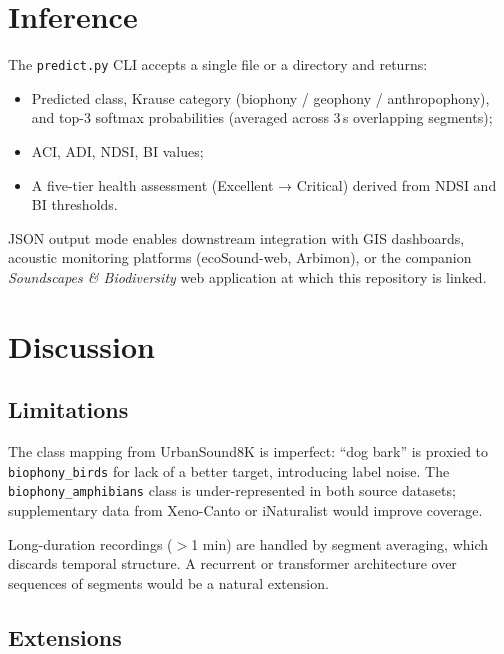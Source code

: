 \documentclass[10pt,twocolumn]{article}
\begin{document}
\section{Inference}
\label{sec:inference}

The \texttt{predict.py} CLI accepts a single file or a directory and returns:
\begin{itemize}[topsep=2pt, itemsep=1pt]
  \item Predicted class, Krause category (biophony / geophony / anthropophony),
        and top-3 softmax probabilities (averaged across 3\,s overlapping
        segments);
  \item ACI, ADI, NDSI, BI values;
  \item A five-tier health assessment (Excellent → Critical) derived from NDSI
        and BI thresholds.
\end{itemize}

JSON output mode enables downstream integration with GIS dashboards,
acoustic monitoring platforms (ecoSound-web, Arbimon), or the companion
\emph{Soundscapes \& Biodiversity} web application at which this repository is
linked.

\section{Discussion}

\subsection{Limitations}

The class mapping from UrbanSound8K is imperfect: ``dog bark'' is proxied to
\texttt{biophony\_birds} for lack of a better target, introducing label noise.
The \texttt{biophony\_amphibians} class is under-represented in both source
datasets; supplementary data from Xeno-Canto or iNaturalist would improve
coverage.

Long-duration recordings ($>$1 min) are handled by segment averaging, which
discards temporal structure. A recurrent or transformer architecture over
sequences of segments would be a natural extension.

\subsection{Extensions}
\end{document}
